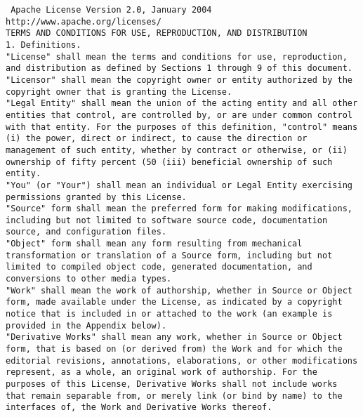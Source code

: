 \setlength{\baselineskip}{0.5\oldbaselineskip}
{\tiny\tt
\noindent
Apache License Version 2.0, January 2004
\\
http://www.apache.org/licenses/
\\[4pt]
TERMS AND CONDITIONS FOR USE, REPRODUCTION, AND DISTRIBUTION
\\[4pt]
1. Definitions.
\\[4pt]
"License" shall mean the terms and conditions for use, reproduction,
and distribution as defined by Sections 1 through 9 of this document.
\\[4pt]
"Licensor" shall mean the copyright owner or entity authorized by the
copyright owner that is granting the License.
\\[4pt]
"Legal Entity" shall mean the union of the acting entity and all other
entities that control, are controlled by, or are under common control
with that entity. For the purposes of this definition, "control" means
(i) the power, direct or indirect, to cause the direction or
management of such entity, whether by contract or otherwise, or (ii)
ownership of fifty percent (50%
(iii) beneficial ownership of such entity.
\\[4pt]
"You" (or "Your") shall mean an individual or Legal Entity exercising
permissions granted by this License.
\\[4pt]
"Source" form shall mean the preferred form for making modifications,
including but not limited to software source code, documentation
source, and configuration files.
\\[4pt]
"Object" form shall mean any form resulting from mechanical
transformation or translation of a Source form, including but not
limited to compiled object code, generated documentation, and
conversions to other media types.
\\[4pt]
"Work" shall mean the work of authorship, whether in Source or Object
form, made available under the License, as indicated by a copyright
notice that is included in or attached to the work (an example is
provided in the Appendix below).
\\[4pt]
"Derivative Works" shall mean any work, whether in Source or Object
form, that is based on (or derived from) the Work and for which the
editorial revisions, annotations, elaborations, or other modifications
represent, as a whole, an original work of authorship. For the
purposes of this License, Derivative Works shall not include works
that remain separable from, or merely link (or bind by name) to the
interfaces of, the Work and Derivative Works thereof.
}
